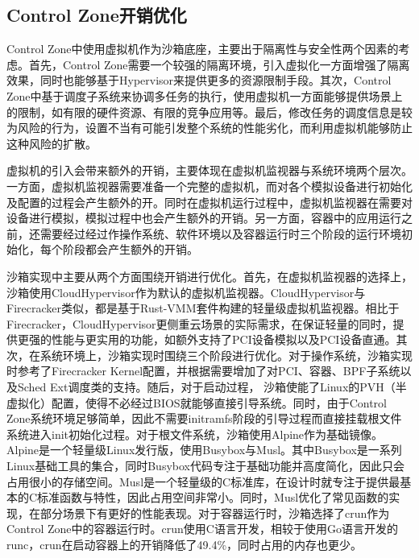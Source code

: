\subsection{Control Zone开销优化}


Control Zone中使用虚拟机作为沙箱底座，主要出于隔离性与安全性两个因素的考虑。首先，Control Zone需要一个较强的隔离环境，引入虚拟化一方面增强了隔离效果，同时也能够基于Hypervisor来提供更多的资源限制手段。其次，Control Zone中基于调度子系统来协调多任务的执行，使用虚拟机一方面能够提供场景上的限制，如有限的硬件资源、有限的竞争应用等。最后，修改任务的调度信息是较为风险的行为，设置不当有可能引发整个系统的性能劣化，而利用虚拟机能够防止这种风险的扩散。

虚拟机的引入会带来额外的开销，主要体现在虚拟机监视器与系统环境两个层次。一方面，虚拟机监视器需要准备一个完整的虚拟机，而对各个模拟设备进行初始化及配置的过程会产生额外的开。同时在虚拟机运行过程中，虚拟机监视器在需要对设备进行模拟，模拟过程中也会产生额外的开销。另一方面，容器中的应用运行之前，还需要经过经过作操作系统、软件环境以及容器运行时三个阶段的运行环境初始化，每个阶段都会产生额外的开销。

沙箱实现中主要从两个方面围绕开销进行优化。首先，在虚拟机监视器的选择上，沙箱使用CloudHypervisor作为默认的虚拟机监视器。CloudHypervisor与Firecracker类似，都是基于Rust-VMM套件构建的轻量级虚拟机监视器。相比于Firecracker，CloudHypervisor更侧重云场景的实际需求\citep{agache2020firecracker}，在保证轻量的同时，提供更强的性能与更实用的功能，如额外支持了PCI设备模拟以及PCI设备直通。其次，在系统环境上，沙箱实现时围绕三个阶段进行优化。对于操作系统，沙箱实现时参考了Firecracker Kernel配置，并根据需要增加了对PCI、容器、BPF子系统以及Sched Ext调度类的支持。随后，对于启动过程， 沙箱使能了Linux的PVH（半虚拟化）配置，使得不必经过BIOS就能够直接引导系统。同时，由于Control Zone系统环境足够简单，因此不需要initramfs阶段的引导过程而直接挂载根文件系统进入init初始化过程。对于根文件系统，沙箱使用Alpine\citep{alpine}作为基础镜像。Alpine是一个轻量级Linux发行版，使用Busybox与Musl。其中Busybox是一系列Linux基础工具的集合，同时Busybox代码专注于基础功能并高度简化，因此只会占用很小的存储空间。Musl是一个轻量级的C标准库，在设计时就专注于提供最基本的C标准函数与特性，因此占用空间非常小。同时，Musl优化了常见函数的实现，在部分场景下有更好的性能表现。对于容器运行时，沙箱选择了crun\citep{crun}作为Control Zone中的容器运行时。crun使用C语言开发，相较于使用Go语言开发的runc，crun在启动容器上的开销降低了49.4\%，同时占用的内存也更少。

